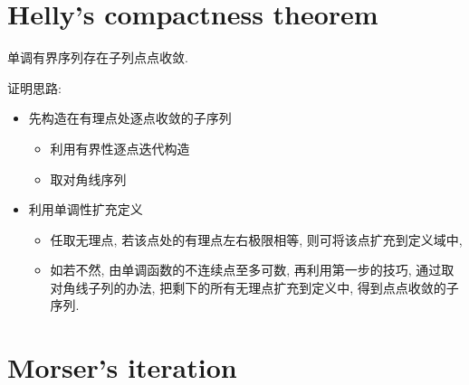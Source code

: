 \section{Helly's compactness theorem}
\begin{theorem}
	单调有界序列存在子列点点收敛.
\end{theorem}
证明思路:
\begin{itemize}
	\item 先构造在有理点处逐点收敛的子序列
	\begin{itemize}
		\item 利用有界性逐点迭代构造
		\item 取对角线序列
	\end{itemize}
	\item 利用单调性扩充定义
	\begin{itemize}
		\item 任取无理点, 若该点处的有理点左右极限相等, 则可将该点扩充到定义域中,
		\item 如若不然, 由单调函数的不连续点至多可数, 
		再利用第一步的技巧, 通过取对角线子列的办法, 
		把剩下的所有无理点扩充到定义中, 得到点点收敛的子序列.
	\end{itemize}
\end{itemize}

\section{Morser's iteration}

